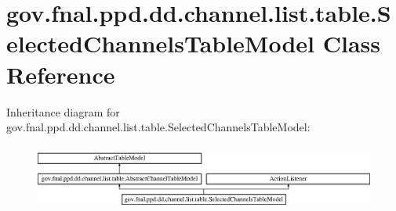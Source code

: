 \hypertarget{classgov_1_1fnal_1_1ppd_1_1dd_1_1channel_1_1list_1_1table_1_1SelectedChannelsTableModel}{\section{gov.\-fnal.\-ppd.\-dd.\-channel.\-list.\-table.\-Selected\-Channels\-Table\-Model Class Reference}
\label{classgov_1_1fnal_1_1ppd_1_1dd_1_1channel_1_1list_1_1table_1_1SelectedChannelsTableModel}
}
Inheritance diagram for gov.\-fnal.\-ppd.\-dd.\-channel.\-list.\-table.\-Selected\-Channels\-Table\-Model\-:\begin{figure}[H]
\begin{center}
\leavevmode
\includegraphics[height=2.210526cm]{classgov_1_1fnal_1_1ppd_1_1dd_1_1channel_1_1list_1_1table_1_1SelectedChannelsTableModel}
\end{center}
\end{figure}
